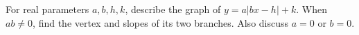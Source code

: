 For real parameters $a,b,h,k$, describe the graph of $y=a|bx-h|+k$. When $ab\ne0$, find the vertex and slopes of its two branches. Also discuss $a=0$ or $b=0$.
